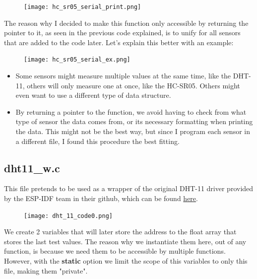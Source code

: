 \documentclass[14pt]{article}
\begin{document}
\begin{normalsize}
		\begin{figure}[h]
			\centering
			\texttt{[image: hc\_sr05\_serial\_print.png]}
		\end{figure}\vspace{5pt}
		The reason why I decided to make this function only accessible by returning the pointer to it, as seen in the previous code explained, is to unify for all sensors that are added to the code later. Let's explain this better with an example:\vspace{-25pt}\\	
		\setlength{\intextsep}{10pt}	
		\begin{figure}
			\begin{center}
				\texttt{[image: hc\_sr05\_serial\_ex.png]}
			\end{center}
		\end{figure}
		\begin{itemize}
			\item Some sensors might measure multiple values at the same time, like the DHT-11, others will only measure one at once, like the HC-SR05. Others might even want to use a different type of data structure.
			\item By returning a pointer to the function, we avoid having to check from what type of sensor the data comes from, or its necessary formatting when printing the data. This might not be the best way, but since I program each sensor in a different file, I found this procedure the best fitting.\\
		\end{itemize}

		\newpage
		
		\subsection{dht11\_w.c}
		This file pretends to be used as a wrapper of the original DHT-11 driver provided by the ESP-IDF team in their github, which can be found \href{https://github.com/UncleRus/esp-idf-lib/blob/master/components/dht/dht.c}{here}.\\
		\setlength{\intextsep}{-10pt}
		\begin{figure}
			\begin{center}
				\texttt{[image: dht\_11\_code0.png]}
			\end{center}
		\end{figure}
		We create 2 variables that will later store the address to the float array that stores the last test values. The reason why we instantiate them here, out of any function, is because we need them to be accessible by multiple functions.\\
		However, with the \textbf{static} option we limit the scope of this variables to only this file, making them "private".
		

\end{normalsize}
\end{document}
